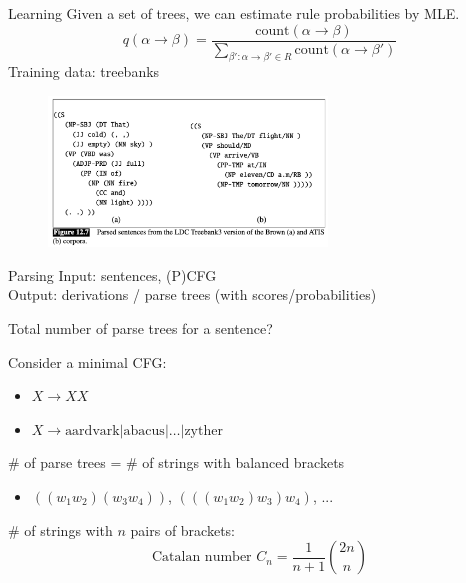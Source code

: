 \documentclass[usenames,dvipsnames,notes]{beamer}
\begin{document}
\begin{frame}
    {Learning}
    Given a set of trees,
    we can estimate rule probabilities by MLE.
    \pause
    $$
    q(\alpha\rightarrow\beta) = \frac{\text{count}(\alpha\rightarrow\beta)}{\sum_{\beta'\colon\alpha\rightarrow\beta'\in R}\text{count}(\alpha\rightarrow\beta')}
    $$
    Training data: treebanks
    \vspace{-1em}
    \begin{figure}    
        \includegraphics[height=4cm]{figures/treebank.png}
    \end{figure}  
\end{frame}

\begin{frame}
    {Parsing}
    Input: sentences, (P)CFG \\
    Output: derivations / parse trees (with scores/probabilities)

    Total number of parse trees for a sentence?

    Consider a minimal CFG:\\
    \begin{itemize}
        \item[] $X\rightarrow XX$
        \item[] $X\rightarrow \text{aardvark} | \text{abacus} | \ldots | \text{zyther}$
    \end{itemize}

    \# of parse trees = \# of strings with balanced brackets\\
    \begin{itemize}
        \item[] $((w_1 w_2) (w_3 w_4))$, $(((w_1 w_2) w_3) w_4)$, ...
    \end{itemize}

    \# of strings with $n$ pairs of brackets:
    $$
    \text{Catalan number } C_n = \frac{1}{n+1}{2n\choose n}
    $$
\end{frame}
\end{document}
